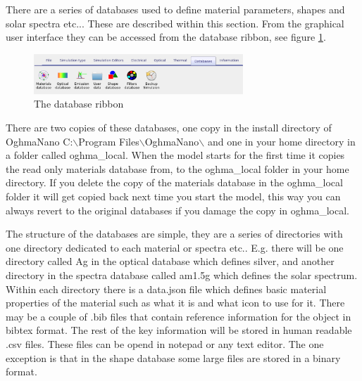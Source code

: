 There are a series of databases used to define material parameters, shapes and solar spectra etc...  These are described within this section.  From the graphical user interface they can be accessed from the database ribbon, see figure \ref{fig:database}.

\begin{figure}[H]
\centering
\includegraphics[width=0.7\textwidth]{./images/database_materials/database_ribbon.png}
\caption{The database ribbon}
\label{fig:database}
\end{figure}

There are two copies of these databases, one copy in the install directory of OghmaNano C:$\backslash$Program Files$\backslash$OghmaNano$\backslash$ and one in your home directory in a folder called oghma\_local.   When the model starts for the first time it copies the read only materials database from, to the oghma\_local folder in your home directory.  If you delete the copy of the materials database in the oghma\_local folder it will get copied back next time you start the model, this way you can always revert to the original databases if you damage the copy in oghma\_local.

The structure of the databases are simple, they are a series of directories with one directory dedicated to each material or spectra etc.. E.g. there will be one directory called Ag in the optical database which defines silver, and another directory in the spectra database called am1.5g which defines the solar spectrum.  Within each directory there is a data.json file which defines basic material properties of the material such as what it is and what icon to use for it.  There may be a couple of .bib files that contain reference information for the object in bibtex format. The rest of the key information will be stored in human readable .csv files. These files can be opend in notepad or any text editor. The one exception is that in the shape database some large files are stored in a binary format.

